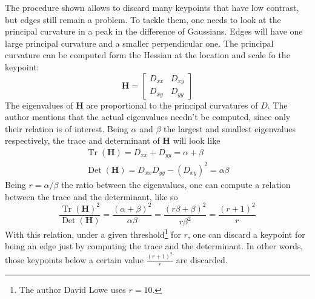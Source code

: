 \documentclass[../main.tex]{subfiles}
\begin{document}
The procedure shown allows to discard many keypoints that have low contrast, but edges still remain a problem. To tackle them, one needs to look at the principal curvature in a peak in the difference of Gaussians. Edges will have one large principal curvature and a smaller perpendicular one. The principal curvature can be computed form the Hessian at the location and scale fo the keypoint:
\begin{equation}
    \mathbf{H}=\left[\begin{array}{ll}
    D_{x x} & D_{x y} \\
    D_{x y} & D_{y y}
    \end{array}\right]
\end{equation}
The eigenvalues of $\mathbf{H}$ are proportional to the principal curvatures of $D$. The author mentions that the actual eigenvalues needn't be computed, since only their relation is of interest. Being $\alpha$ and $\beta$ the largest and smallest eigenvalues respectively, the trace and determinant of $\mathbf{H}$ will look like
\begin{equation}
    \begin{array}{c}
    \operatorname{Tr}(\mathbf{H})=D_{x x}+D_{y y}=\alpha+\beta \\
    \operatorname{Det}(\mathbf{H})=D_{x x} D_{y y}-\left(D_{x y}\right)^{2}=\alpha \beta
    \end{array}
\end{equation}
Being $r=\alpha/\beta$ the ratio between the eigenvalues, one can compute a relation between the trace and the determinant, like so
\begin{equation}
    \frac{\operatorname{Tr}(\mathbf{H})^{2}}{\operatorname{Det}(\mathbf{H})}=\frac{(\alpha+\beta)^{2}}{\alpha \beta}=\frac{(r \beta+\beta)^{2}}{r \beta^{2}}=\frac{(r+1)^{2}}{r}
\end{equation}
With this relation, under a given threshold\footnote{The author David Lowe uses $r=10$.} for $r$, one can discard a keypoint for being an edge just by computing the trace and the determinant. In other words, those keypoints below a certain value $\frac{(r+1)^{2}}{r}$ are discarded.
\end{document}
